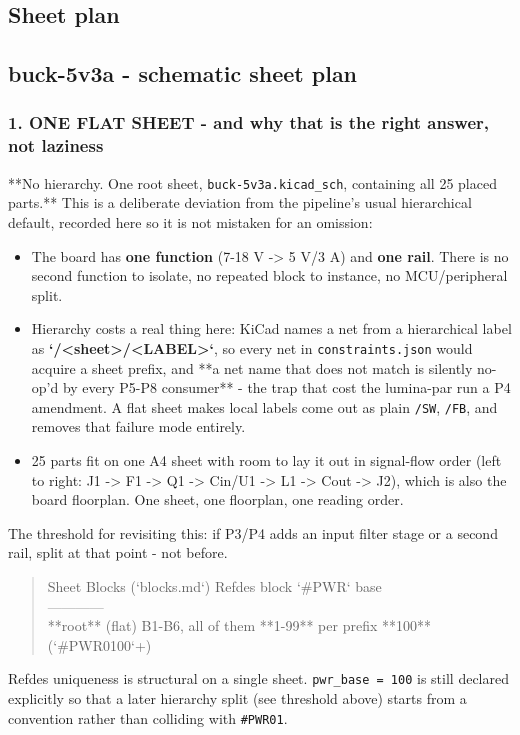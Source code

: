 \documentclass[11pt,a4paper]{article}
\begin{document}
\subsection*{Sheet plan}
\subsection*{buck-5v3a - schematic sheet plan}
\subsubsection*{1. ONE FLAT SHEET - and why that is the right answer, not laziness}
{*}{*}No hierarchy. One root sheet, \texttt{buck-5v3a.kicad\_sch}, containing all 25 placed parts.{*}{*} This is a deliberate deviation from the pipeline's usual hierarchical default, recorded here so it is not mistaken for an omission:

\begin{itemize}
\item The board has \textbf{one function} (7-18 V -\textgreater{} 5 V/3 A) and \textbf{one rail}. There is no
second function to isolate, no repeated block to instance, no MCU/peripheral split.
\item Hierarchy costs a real thing here: KiCad names a net from a hierarchical label as
\textbf{`/\textless{}sheet\textgreater{}/\textless{}LABEL\textgreater{}`}, so every net in \texttt{constraints.json} would acquire a sheet
prefix, and {*}{*}a net name that does not match is silently no-op'd by every P5-P8
consumer{*}{*} - the trap that cost the lumina-par run a P4 amendment. A flat sheet
makes local labels come out as plain \texttt{/SW}, \texttt{/FB}, and removes that failure mode
entirely.
\item 25 parts fit on one A4 sheet with room to lay it out in signal-flow order
(left to right: J1 -\textgreater{} F1 -\textgreater{} Q1 -\textgreater{} Cin/U1 -\textgreater{} L1 -\textgreater{} Cout -\textgreater{} J2), which is also the
board floorplan. One sheet, one floorplan, one reading order.
\end{itemize}
The threshold for revisiting this: if P3/P4 adds an input filter stage or a second rail, split at that point - not before.

\begin{quote}\small\ttfamily\raggedright
\textbar{} Sheet \textbar{} Blocks (`blocks.md`) \textbar{} Refdes block \textbar{} `\#PWR` base \textbar{}\\
\textbar{}---\textbar{}---\textbar{}---\textbar{}---\textbar{}\\
\textbar{} {*}{*}root{*}{*} (flat) \textbar{} B1-B6, all of them \textbar{} {*}{*}1-99{*}{*} per prefix \textbar{} {*}{*}100{*}{*} (`\#PWR0100`+) \textbar{}
\end{quote}
Refdes uniqueness is structural on a single sheet. \texttt{pwr\_base = 100} is still declared explicitly so that a later hierarchy split (see threshold above) starts from a convention rather than colliding with \texttt{\#PWR01}.
\end{document}
